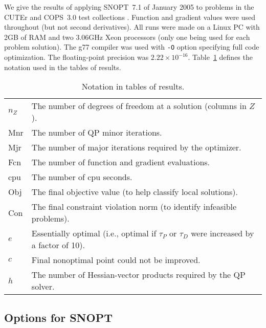 \documentclass[draft,leqno,onefignum,onetabnum]{siamltex}
\def\D{_{\scriptscriptstyle D}}
\def\P{_{\scriptscriptstyle P}}
\def\Z{_{\scriptscriptstyle Z}}
\def\strutl{\rule[-1.25ex]{0pt}{3ex}}%
\def\strutu{\rule{0pt}{3ex}}%
\def\v#1{\texttt{#1}}
\def\COPS  {{\small COPS}}
\def\CUTEr {{\small CUTEr}}
\def\SNOPT {{\small SNOPT}}
\begin{document}
We give the results of applying \SNOPT~7.1 of January 2005 to problems in
the \CUTEr{} and \COPS~3.0 test collections
\cite{BonCGT95,BonDM98,DolM00,DolMM04}.
Function and gradient values were used throughout (but not second
derivatives).
All runs were made on a Linux PC with 2GB of RAM and
two 3.06GHz Xeon processors (only one being used for each problem
solution).  The g77 compiler was used with \v{-O} option
specifying full code optimization.
The floating-point precision was $2.22 \times 10^{-16}$.
Table~\ref{table_notation} defines the notation used in the tables of
results.

\begin{table}[ht] \footnotesize
\caption{Notation in tables of results.}
\label{table_notation}
\begin{center}
 \begin{tabular}{|l|l|}
\hline\strutu $n\Z$ & The number of degrees of freedom at a solution (columns in $Z$).
\\            Mnr   & The number of QP minor iterations.
\\            Mjr   & The number of major iterations required by the optimizer.
\\            Fcn   & The number of function and gradient evaluations.
\\            cpu   & The number of cpu seconds.
\\            Obj   & The final objective value (to help classify local solutions).
\\            Con   & The final constraint violation norm (to identify infeasible problems).
\\            $e$   & Essentially optimal
                      (i.e., optimal if $\tau\P$ or $\tau\D$
                      were increased by a factor of 10).
\\            $c$   & Final nonoptimal point could not be improved.
\\\strutl     $h$   & The number of Hessian-vector products required by the QP solver.
\\\hline
\end{tabular}
\end{center}
\end{table}


 \subsection{Options for SNOPT}   \label{sec-SNOPTparams}
\end{document}
